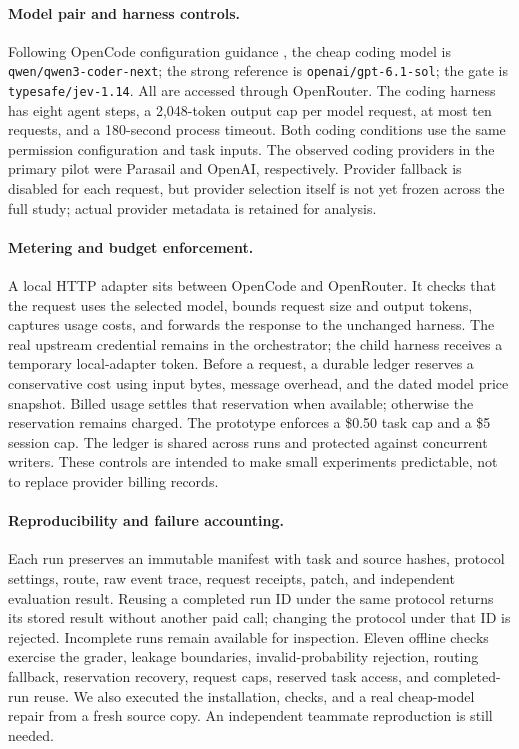 \documentclass{article}
\begin{document}
\paragraph{Model pair and harness controls.}
Following OpenCode configuration guidance \citep{opencode2026}, the cheap coding model is \texttt{qwen/qwen3-coder-next}; the strong reference is \texttt{openai/gpt-6.1-sol}; the gate is \texttt{typesafe/jev-1.14}. All are accessed through OpenRouter. The coding harness has eight agent steps, a 2,048-token output cap per model request, at most ten requests, and a 180-second process timeout. Both coding conditions use the same permission configuration and task inputs. The observed coding providers in the primary pilot were Parasail and OpenAI, respectively. Provider fallback is disabled for each request, but provider selection itself is not yet frozen across the full study; actual provider metadata is retained for analysis.

\paragraph{Metering and budget enforcement.}
A local HTTP adapter sits between OpenCode and OpenRouter. It checks that the request uses the selected model, bounds request size and output tokens, captures usage costs, and forwards the response to the unchanged harness. The real upstream credential remains in the orchestrator; the child harness receives a temporary local-adapter token. Before a request, a durable ledger reserves a conservative cost using input bytes, message overhead, and the dated model price snapshot. Billed usage settles that reservation when available; otherwise the reservation remains charged. The prototype enforces a \$0.50 task cap and a \$5 session cap. The ledger is shared across runs and protected against concurrent writers. These controls are intended to make small experiments predictable, not to replace provider billing records.

\paragraph{Reproducibility and failure accounting.}
Each run preserves an immutable manifest with task and source hashes, protocol settings, route, raw event trace, request receipts, patch, and independent evaluation result. Reusing a completed run ID under the same protocol returns its stored result without another paid call; changing the protocol under that ID is rejected. Incomplete runs remain available for inspection. Eleven offline checks exercise the grader, leakage boundaries, invalid-probability rejection, routing fallback, reservation recovery, request caps, reserved task access, and completed-run reuse. We also executed the installation, checks, and a real cheap-model repair from a fresh source copy. An independent teammate reproduction is still needed.
\end{document}
